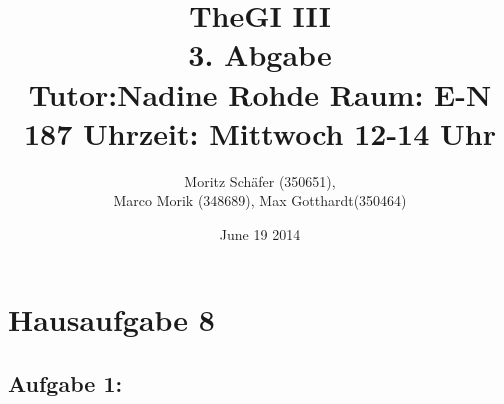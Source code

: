 \documentclass[10pt,a4paper,german,landscape,fleqn]{article} \usepackage[utf8]{inputenc} %
\begin{document}
\title{TheGI III \\
3. Abgabe\\
Tutor:Nadine Rohde Raum: E-N 187 Uhrzeit: Mittwoch 12-14 Uhr \\ } %
\author{Moritz Schäfer (350651), \\
Marco Morik (348689), Max Gotthardt(350464)} %
\date{June 19 2014} %

\maketitle



\newpage
\section*{Hausaufgabe 8}
\subsection*{Aufgabe 1:}
\end{document}
